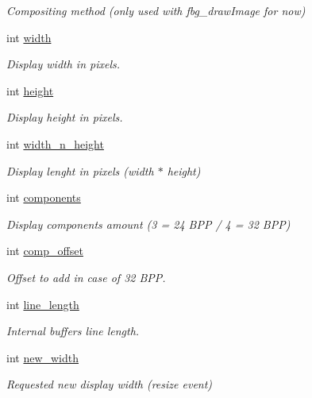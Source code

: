 \begin{DoxyCompactItemize}
\begin{DoxyCompactList}\small\item\em Compositing method (only used with fbg\+\_\+draw\+Image for now) \end{DoxyCompactList}\item 
int \hyperlink{struct__fbg_a1d3c76643e4ee424f4d17e27991d5e2e}{width}
\begin{DoxyCompactList}\small\item\em Display width in pixels. \end{DoxyCompactList}\item 
int \hyperlink{struct__fbg_a3a3bd409e71d020fa77f69a541d832f8}{height}
\begin{DoxyCompactList}\small\item\em Display height in pixels. \end{DoxyCompactList}\item 
int \hyperlink{struct__fbg_a1ab3f10e8c3483d7286db9850511d46d}{width\+\_\+n\+\_\+height}
\begin{DoxyCompactList}\small\item\em Display lenght in pixels (width $\ast$ height) \end{DoxyCompactList}\item 
int \hyperlink{struct__fbg_a1db77a2ef506723a575644dbc1cfb747}{components}
\begin{DoxyCompactList}\small\item\em Display components amount (3 = 24 B\+PP / 4 = 32 B\+PP) \end{DoxyCompactList}\item 
int \hyperlink{struct__fbg_a7c2e64d2f40575c8a989c759c30acb0e}{comp\+\_\+offset}
\begin{DoxyCompactList}\small\item\em Offset to add in case of 32 B\+PP. \end{DoxyCompactList}\item 
int \hyperlink{struct__fbg_af8a1ee8d7004e6f2193f2a3ed98f8ce8}{line\+\_\+length}
\begin{DoxyCompactList}\small\item\em Internal buffers line length. \end{DoxyCompactList}\item 
int \hyperlink{struct__fbg_a95859bd418a5cfff155cdb1421d295ef}{new\+\_\+width}
\begin{DoxyCompactList}\small\item\em Requested new display width (resize event) \end{DoxyCompactList}\item 

\end{DoxyCompactItemize}
